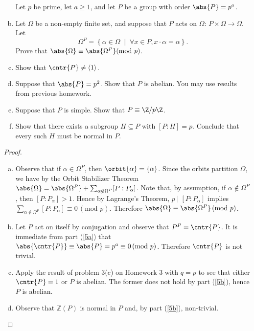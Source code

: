 \documentclass[10pt]{amsart}
\begin{document}
\begin{thm}
  \begin{enumerate}[(a)]
    Let $p$ be prime, let $a \geq 1$, and let $P$ be a group with order $\abs{P} = p^a$.
    \item
      Let $\Omega$ be a non-empty finite set, and suppose that $P$ acts on $\Omega$:  $ P \times \Omega \rightarrow \Omega$.
      Let $$\Omega^{P} = \left\{\alpha \in \Omega \;\middle\vert\; \forall x \in P, x \cdot \alpha = \alpha\right\}.$$
      Prove that $\abs{\Omega} \equiv \abs{\Omega^{P}} (\text{mod } p)$.
    \item
      Show that $\cntr{P} \not = \left<1\right>$.
    \item
      Suppose that $\abs{P} = p^2$.  
      Show that $P$ is abelian.
      You may use results from previous homework.
    \item
      Suppose that $P$ is simple.
      Show that $P \equiv \Z/p\Z$.
    \item
      Show that there exists a subgroup $H \subseteq P$ with $[P : H] = p$.
      Conclude that every such $H$ must be normal in $P$.
  \end{enumerate}
  \begin{proof}
    \begin{enumerate}[(a)]
    \item\label{5a}
      Observe that if $\alpha \in \Omega^P$, then $\orbit{\alpha} = \left\{\alpha\right\}$.
      Since the orbits partition $\Omega$, we have by the Orbit Stabilizer Theorem $\abs{\Omega} = \abs{\Omega^P} + \sum_{\alpha \not \in \Omega^P} [P : P_\alpha]$.
      Note that, by assumption, if $\alpha \not \in \Omega^P$, then $[P : P_\alpha] > 1$.
      Hence by Lagrange's Theorem, $p \mid [P : P_\alpha]$ implies $\sum_{\alpha \not \in \Omega^P} [P : P_\alpha] \equiv 0\, (\text{mod } p)$.
      Therefore $\abs{\Omega} \equiv \abs{\Omega^P}\, (\text{mod } p)$.
    \item\label{5b}
      Let $P$ act on itself by conjugation and observe that $P^P = \cntr{P}$.
      It is immediate from part (\ref{5a}) that $\abs{\cntr{P}} \equiv \abs{P} = p^a \equiv 0 \, (\text{mod } p)$.
      Therefore $\cntr{P}$ is not trivial.
    \item\label{5c}
      Apply the result of problem 3(c) on Homework 3 with $q = p$ to see that either $\cntr{P} = 1$ or $P$ is abelian.
      The former does not hold by part (\ref{5b}), hence $P$ is abelian.
    \item\label{5d}
      Observe that $\mathbb{Z}(P)$ is normal in $P$ and, by part (\ref{5b}), non-trivial.

\end{enumerate}
\end{proof}
\end{thm}
\end{document}
